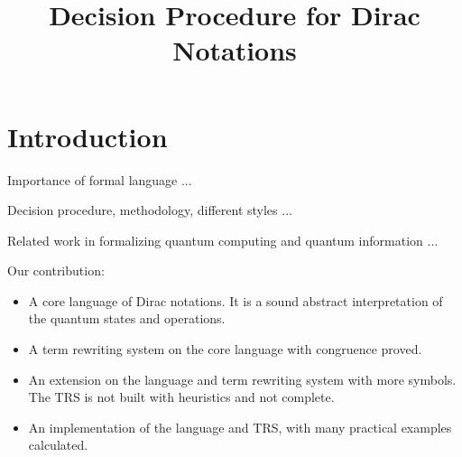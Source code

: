 \documentclass[manuscript, review, timestamp]{acmart}
\begin{document}
\title{Decision Procedure for Dirac Notations}



\begin{abstract}
\end{abstract}



\maketitle

\section{Introduction}

Importance of formal language ...

Decision procedure, methodology, different styles ...

Related work in formalizing quantum computing and quantum information ...

Our contribution:
\begin{itemize}
  \item A core language of Dirac notations. It is a sound abstract interpretation of the quantum states and operations. 
  \item A term rewriting system on the core language with congruence proved.
  \item An extension on the language and term rewriting system with more symbols. The TRS is not built with heuristics and not complete.
  \item An implementation of the language and TRS, with many practical examples calculated.
\end{itemize}
\end{document}
